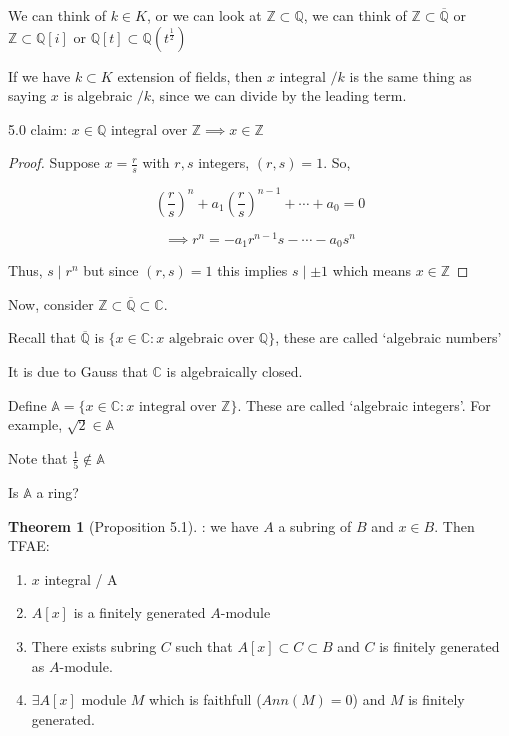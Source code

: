 \documentclass{article}
\theoremstyle{definition}
\newtheorem{theorem}{Theorem}
\begin{document}
We can think of \(k\in K\), or we can look at \(\mathbb{Z} \subset \mathbb{Q}\), we can think of \(\mathbb{Z} \subset \overline{\mathbb{Q}} \) or \(\mathbb{Z} \subset \mathbb{Q} [i]\) or \(\mathbb{Q} [t] \subset \mathbb{Q} (t^\frac{1}{2})\) 

If we have \(k \subset K\) extension of fields, then \(x\) integral \(/ k\) is the same thing as saying \(x\) is algebraic \(/ k\), since we can divide by the leading term.

5.0 claim: \(x\in \mathbb{Q}\) integral over \(\mathbb{Z} \implies x\in\mathbb{Z}\) 

\begin{proof}
    Suppose \(x = \frac{r}{s}\) with \(r,s\) integers, \((r,s)=1\). So,

    \[
        (\frac{r}{s})^n + a_1 (\frac{r}{s})^{n-1} + \cdots + a_0 = 0 
    \]

    \[
        \implies r^n = - a_1 r^{n-1} s - \cdots - a_0 s^n 
    \]

    Thus, \(s\mid r^n\) but since \((r,s)=1\) this implies \(s\mid\pm 1\) which means \(x\in\mathbb{Z}\) 

\end{proof}

Now, consider \(\mathbb{Z} \subset \overline{\mathbb{Q}} \subset \mathbb{C}\).

Recall that \(\overline{\mathbb{Q}}\) is \(\{ x\in\mathbb{C} : x \text{ algebraic over } \mathbb{Q} \} \), these are called `algebraic numbers'

It is due to Gauss that \(\mathbb{C}\) is algebraically closed.

Define \(\mathbb{A} = \{ x\in\mathbb{C} : x \text{ integral over } \mathbb{Z} \} \). These are called `algebraic integers'. For example, \(\sqrt{2} \in \mathbb{A}\)

Note that \(\frac{1}{5}\notin \mathbb{A}\) 

Is \(\mathbb{A}\) a ring?

\begin{theorem}
    [Proposition 5.1]: we have \(A\) a subring of \(B\) and \(x\in B\). Then TFAE:

    \begin{enumerate}
        \item \(x\) integral / A
        \item \(A[x]\) is a finitely generated \(A\)-module
        \item There exists subring \(C\) such that \(A[x] \subset C \subset B\) and \(C\) is finitely generated as \(A\)-module.
        \item \(\exists A[x]\) module \(M\) which is faithfull (\(Ann(M)=0\)) and \(M\) is finitely generated.
    \end{enumerate}
\end{theorem}
\end{document}

